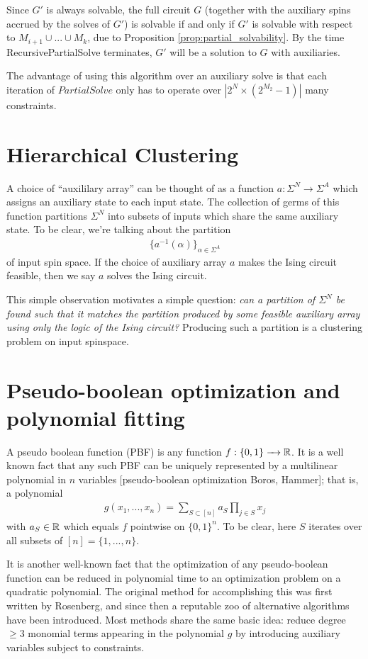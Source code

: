\documentclass{amsart}
\begin{document}
Since $G'$ is always solvable, the full circuit $G$ (together with the auxiliary spins accrued by the solves of $G'$) is solvable if and only if $G'$ is solvable with respect to $M_{i+1} \cup ... \cup M_k$, due to Proposition \ref{prop:partial_solvability}. By the time RecursivePartialSolve terminates, $G'$ will be a solution to $G$ with auxiliaries.

The advantage of using this algorithm over an auxiliary solve is that each iteration of $PartialSolve$ only has to operate over $|2^N\times (2^{M_2} - 1)|$ many constraints.
\section{Hierarchical Clustering}

A choice of ``auxililary array'' can be thought of as a function $a:\Sigma^N \to \Sigma^A$ which assigns an auxiliary state to each input state. The collection of germs of this function partitions $\Sigma^N$ into subsets of inputs which share the same auxiliary state. To be clear, we're talking about the partition
\begin{align*}
  \{a^{-1}(\alpha)\}_{\alpha \in \Sigma^A}
\end{align*}
of input spin space. If the choice of auxiliary array $a$ makes the Ising circuit feasible, then we say $a$ solves the Ising circuit.

This simple observation motivates a simple question: \emph{can a partition of $\Sigma^N$ be found such that it matches the partition produced by some feasible auxiliary array using only the logic of the Ising circuit?} Producing such a partition is a clustering problem on input spinspace.

\section{Pseudo-boolean optimization and polynomial fitting}
A pseudo boolean function (PBF) is any function $f:\{0,1\}\to \bR$. It is a well known fact that any such PBF can be uniquely represented by a multilinear polynomial in $n$ variables [pseudo-boolean optimization Boros, Hammer]; that is, a polynomial
\begin{align*}
  g(x_1,...,x_n) = \sum_{S \subset [n]} a_S \prod_{j \in S}x_j
\end{align*}
with $a_S \in \mathbb{R}$ which equals $f$ pointwise on $\{0,1\}^n$. To be clear, here $S$ iterates over all subsets of $[n] = \{1,...,n\}$.

It is another well-known fact that the optimization of any pseudo-boolean function can be reduced in polynomial time to an optimization problem on a quadratic polynomial. The original method for accomplishing this was first written by Rosenberg, and since then a reputable zoo of alternative algorithms have been introduced. Most methods share the same basic idea: reduce degree $\geq 3$ monomial terms appearing in the polynomial $g$ by introducing auxiliary variables subject to constraints.
\end{document}
